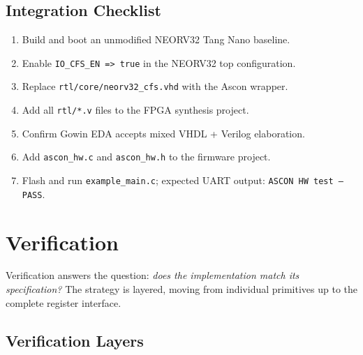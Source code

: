 \documentclass[11pt,a4paper]{article}
\begin{document}
\subsection{Integration Checklist}

\begin{enumerate}
  \item Build and boot an unmodified NEORV32 Tang Nano baseline.
  \item Enable \texttt{IO\_CFS\_EN => true} in the NEORV32 top configuration.
  \item Replace \texttt{rtl/core/neorv32\_cfs.vhd} with the Ascon wrapper.
  \item Add all \texttt{rtl/*.v} files to the FPGA synthesis project.
  \item Confirm Gowin EDA accepts mixed VHDL + Verilog elaboration.
  \item Add \texttt{ascon\_hw.c} and \texttt{ascon\_hw.h} to the firmware project.
  \item Flash and run \texttt{example\_main.c}; expected UART output:
        \texttt{ASCON HW test -- PASS}.
\end{enumerate}

\section{Verification}
\label{sec:verification}

Verification answers the question: \textit{does the implementation match its
specification?} The strategy is layered, moving from individual primitives up
to the complete register interface.

\subsection{Verification Layers}
\end{document}

